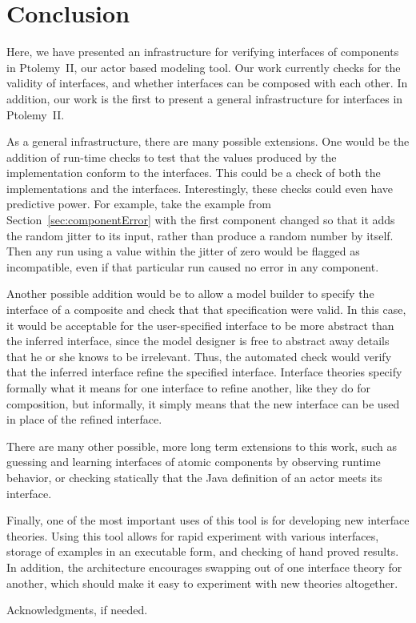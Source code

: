 \documentclass[preprint,11pt,authoryear]{sigplanconf}
\begin{document}
\section{Conclusion}
Here, we have presented an infrastructure for verifying interfaces of components in Ptolemy~II, our actor based modeling tool.
Our work currently checks for the validity of interfaces, and whether interfaces can be composed with each other.
In addition, our work is the first to present a general infrastructure for interfaces in Ptolemy~II.

As a general infrastructure, there are many possible extensions.
One would be the addition of run-time checks to test that the values produced by the implementation conform to the interfaces.
This could be a check of both the implementations and the interfaces.
Interestingly, these checks could even have predictive power.
For example, take the example from Section~\ref{sec:componentError} with the first component changed so that it adds the random jitter to its input, rather than produce a random number by itself.
Then any run using a value within the jitter of zero would be flagged as incompatible, even if that particular run caused no error in any component.

Another possible addition would be to allow a model builder to specify the interface of a composite and check that that specification
were valid.
In this case, it would be acceptable for the user-specified interface to be more abstract than the inferred interface, since the model designer is free to abstract away details that he or she knows to be irrelevant.
Thus, the automated check would verify that the inferred interface refine the specified interface.
Interface theories specify formally what it means for one interface to refine another, like they do for composition, but informally, it simply means that the new interface can be used in place of the refined interface.

There are many other possible, more long term extensions to this work, such as guessing and learning interfaces of atomic components by observing runtime behavior, or checking statically that the Java definition of an actor meets its interface.

Finally, one of the most important uses of this tool is for developing new interface theories.
Using this tool allows for rapid experiment with various interfaces, storage of examples in an executable form, and checking of hand proved results.
In addition, the architecture encourages swapping out of one interface theory for another, which should make it easy to experiment with new theories altogether.


\acks

Acknowledgments, if needed.




\end{document}
